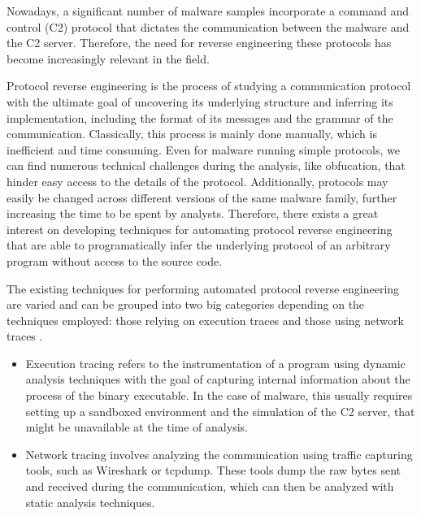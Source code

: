 \documentclass[conference]{IEEEtran}
\begin{document}
Nowadays, a significant number of malware samples incorporate a command and
control (C2) protocol that dictates the communication between the malware and
the C2 server. Therefore, the need for reverse engineering these protocols has
become increasingly relevant in the field.

Protocol reverse engineering is the process of studying a communication
protocol with the ultimate goal of uncovering its underlying structure and
inferring its implementation, including the format of its messages and the
grammar of the communication. Classically, this process is mainly done
manually, which is inefficient and time consuming. Even for malware running
simple protocols, we can find numerous technical challenges during the
analysis, like obfucation, that hinder easy access to the details of the
protocol. Additionally, protocols may easily be changed across different
versions of the same malware family, further increasing the time to be spent by
analysts. Therefore, there exists a great interest on developing techniques for
automating protocol reverse engineering that are able to programatically infer
the underlying protocol of an arbitrary program without access to the source
code.

The existing techniques for performing automated protocol reverse engineering
are varied and can be grouped into two big categories depending on the
techniques employed: those relying on execution traces and those using network
traces \cite{sota_apre}\cite{sota_apre2}.

\begin{itemize}
    \item Execution tracing refers to the instrumentation of a program using dynamic
          analysis techniques with the goal of capturing internal information about the
          process of the binary executable. In the case of malware, this usually requires
          setting up a sandboxed environment and the simulation of the C2 server, that
          might be unavailable at the time of analysis.
    \item Network tracing involves analyzing the communication using traffic capturing
          tools, such as Wireshark or tcpdump. These tools dump the raw bytes sent and
          received during the communication, which can then be analyzed with static
          analysis techniques.
\end{itemize}
\end{document}
